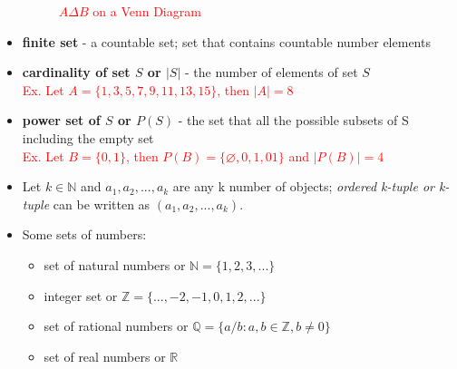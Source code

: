 \begin{itemize}
\begin{itemize}
\end{itemize}
\begin{figure}[h!]
	\centering
\caption{\textcolor{red}{$A \Delta B$ on a Venn Diagram}}
	\end{figure}

 \item \textbf{finite set} - a countable set; set that contains countable number elements
 \item  \textbf{cardinality of set $S$ or $|S|$} - the number of elements of set $S$\\
 \textcolor{red}{Ex. Let $A=\{1,3,5,7,9,11,13,15\}$, then $|A|=8$}
 \item \textbf{power set of $S$ or $P(S)$} - the set that all the possible subsets of S including the empty set\\
 \textcolor{red}{Ex. Let $B=\{0,1\}$, then $P(B)=\{\varnothing,0,1,01\}$ and $|P(B)|=4$}
 \item Let $k \in \mathbb{N}$ and $a_1,a_2,...,a_k$ are any k number of objects; \textit{ordered k-tuple or k-tuple} can be written as $(a_1,a_2,...,a_k)$.
 \item Some sets of numbers:
 \begin{itemize}
 	\item set of natural numbers or $\mathbb{N} = \{1,2,3,...\}$
 	\item integer set or $\mathbb{Z} = \{...,-2,-1,0,1,2,...\}$
 	\item set of rational numbers or $\mathbb{Q} = \{a/b:a,b \in \mathbb{Z},b\neq 0 \}$
 	\item set of real numbers or $\mathbb{R}$
 \end{itemize}
\end{itemize}

